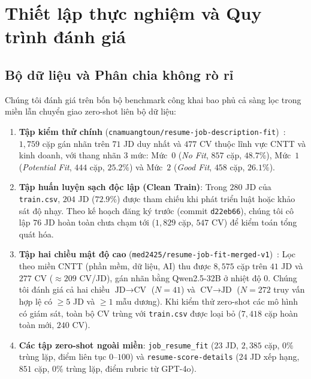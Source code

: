 \section{Thiết lập thực nghiệm và Quy trình đánh giá}

\subsection{Bộ dữ liệu và Phân chia không rò rỉ}
Chúng tôi đánh giá trên bốn bộ benchmark công khai bao phủ cả sàng lọc trong miền lẫn chuyển giao zero-shot liên bộ dữ liệu:
\begin{enumerate}
    \item \textbf{Tập kiểm thử chính} (\texttt{cnamuangtoun/resume-job-description-fit})~\cite{huggingface_resume_fit}: $1{,}759$ cặp gán nhãn trên $71$ JD duy nhất và $477$ CV thuộc lĩnh vực CNTT và kinh doanh, với thang nhãn 3 mức: Mức~$0$ (\textit{No Fit}, $857$ cặp, $48.7\%$), Mức~$1$ (\textit{Potential Fit}, $444$ cặp, $25.2\%$) và Mức~$2$ (\textit{Good Fit}, $458$ cặp, $26.1\%$).
    \item \textbf{Tập huấn luyện sạch độc lập (Clean Train)}: Trong $280$ JD của \texttt{train.csv}, $204$ JD ($72.9\%$) được tham chiếu khi phát triển luật hoặc khảo sát độ nhạy. Theo kế hoạch đăng ký trước (commit \texttt{d22eb66}), chúng tôi cô lập $76$ JD hoàn toàn chưa chạm tới ($1{,}829$ cặp, $547$ CV) để kiểm toán tổng quát hóa.
    \item \textbf{Tập hai chiều mật độ cao} (\texttt{med2425/\allowbreak resume-job-fit-\allowbreak merged-v1})~\cite{med2425_dataset}: Lọc theo miền CNTT (phần mềm, dữ liệu, AI) thu được $8{,}575$ cặp trên $41$ JD và $277$ CV ($\approx 209$ CV/JD), gán nhãn bằng Qwen2.5-32B ở nhiệt độ $0$. Chúng tôi đánh giá cả hai chiều $\text{JD}\rightarrow\text{CV}$ ($N=41$) và $\text{CV}\rightarrow\text{JD}$ ($N=272$ truy vấn hợp lệ có $\ge 5$ JD và $\ge 1$ mẫu dương). Khi kiểm thử zero-shot các mô hình có giám sát, toàn bộ CV trùng với \texttt{train.csv} được loại bỏ ($7{,}418$ cặp hoàn toàn mới, $240$ CV).
    \item \textbf{Các tập zero-shot ngoài miền}: \texttt{job\_resume\_fit} ($23$ JD, $2{,}385$ cặp, $0\%$ trùng lặp, điểm liên tục $0$--$100$) và \texttt{resume-score-details} ($24$ JD xếp hạng, $851$ cặp, $0\%$ trùng lặp, điểm rubric từ GPT-4o).
\end{enumerate}

